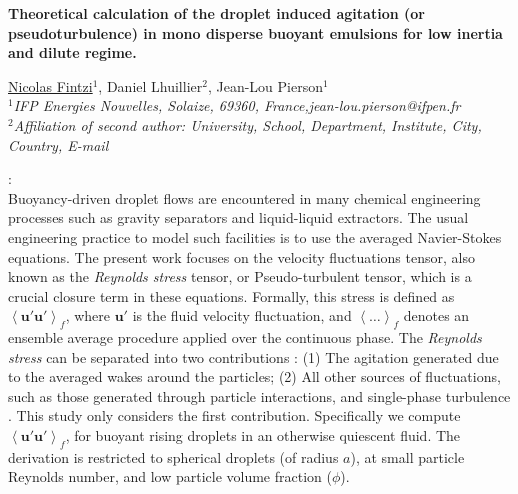 \documentclass[12pt,a4paper]{article}
\newcommand{\avg}[1]{\left<#1\right>}
\renewcommand{\avg}[1]{\left<#1\right>}
\begin{document}
\pagestyle{fancy}
\fancyhf{}

\lhead{\textcolor{mygray}{12th International Conference on Multiphase flow}}
\rhead{\textcolor{mygray}{ICMF 2025, Toulouse, France, May 12-16, 2025}}
\lfoot{}
\cfoot{}
\rfoot{}

\begin{center}
{\large {\bf Theoretical calculation of the droplet induced agitation (or pseudoturbulence) in mono disperse buoyant emulsions for low inertia and dilute regime.}}
\vspace{10pt}


\underline{Nicolas Fintzi}$^1$, Daniel Lhuillier$^2$, Jean-Lou Pierson$^1$\\
{\it
$^1$IFP Energies Nouvelles, Solaize, 69360, France,jean-lou.pierson@ifpen.fr\\
$^2$Affiliation of second author: University, School, Department, Institute, City, Country, E-mail\\
}
\end{center}

\vspace{10pt}
:\\
Buoyancy-driven droplet flows are encountered in many chemical engineering processes such as gravity separators and liquid-liquid extractors. 
The usual engineering practice to model such facilities is to use the averaged Navier-Stokes equations. 
The present work focuses on the velocity fluctuations tensor, also known as the \textit{Reynolds stress} tensor, or Pseudo-turbulent tensor, which is a crucial closure term in these equations.
Formally, this stress is defined as $\avg{ \textbf{u}' \textbf{u}'}_f$, where $\textbf{u}'$ is the fluid velocity fluctuation, and $\avg{\ldots}_f$ denotes an ensemble average procedure applied over the continuous phase. 
The \textit{Reynolds stress} can be separated into two contributions : (1) The agitation generated due to the averaged wakes around the particles; (2) All other sources of fluctuations, such as those generated through particle interactions, and single-phase turbulence \cite{du2022analysis}.
This study only considers the first contribution. 
Specifically we compute $\avg{ \textbf{u}' \textbf{u}'}_f$, for buoyant rising droplets in an otherwise quiescent fluid. 
The derivation is restricted to spherical droplets (of radius $a$), at small particle Reynolds number, and low particle volume fraction ($\phi$). 
    \vspace{10pt}
\end{document}
